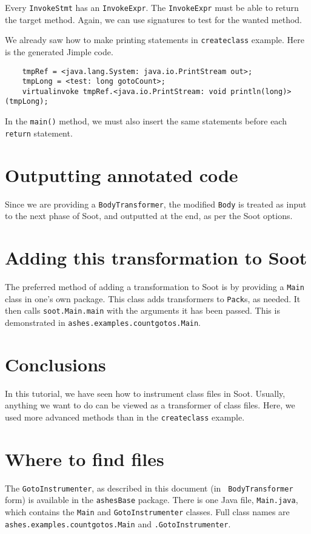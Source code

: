 \documentclass{article}
\begin{document}
Every {\tt InvokeStmt} has an {\tt InvokeExpr}. The 
{\tt InvokeExpr} must be able to return the target method. 
Again, we can use signatures to test for the wanted method. 

We already saw how to make printing statements in {\tt createclass}
example.  Here is the generated Jimple code.
\begin{verbatim}
    tmpRef = <java.lang.System: java.io.PrintStream out>;
    tmpLong = <test: long gotoCount>;
    virtualinvoke tmpRef.<java.io.PrintStream: void println(long)>(tmpLong);
\end{verbatim}

In the {\tt main()} method, we must also insert the same 
statements before each {\tt return} statement.

\section{Outputting annotated code}

Since we are providing a {\tt BodyTransformer}, the modified {\tt Body}
is treated as input to the next phase of Soot, and outputted at the end,
as per the Soot options.

\section{Adding this transformation to Soot}

The preferred method of adding a transformation to Soot is by providing a
{\tt Main} class in one's own package.  This class adds transformers
to {\tt Pack}s, as needed.  It then calls {\tt soot.Main.main} with
the arguments it has been passed.  This is demonstrated in 
{\tt ashes.examples.countgotos.Main}.

\section{Conclusions}

In this tutorial, we have seen how to instrument class files in Soot.
Usually, anything we want to do can be viewed as a transformer of
class files. Here, we used more advanced methods than in the {\tt createclass}
example.

\section*{Where to find files}

The {\tt GotoInstrumenter}, as described in this document (in {\tt
BodyTransformer} form) is available in the {\tt ashesBase} package.
There is one Java file, {\tt Main.java}, which contains the
{\tt Main} and {\tt GotoInstrumenter} classes.
Full class names are {\tt ashes.examples.countgotos.Main} and
{\tt .GotoInstrumenter}.
\end{document}
